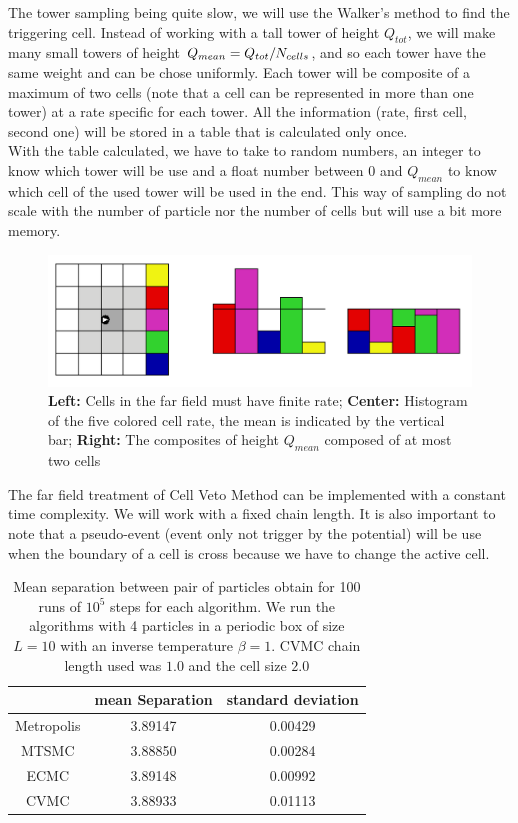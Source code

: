 \documentclass[jcp,twocolumn,longbibliography,superscriptaddress]{revtex4-2}
\begin{document}
	The tower sampling being quite slow, we will use the Walker's method  to find the triggering cell. Instead of working with a tall tower of height $Q_{tot}$, we will make many small towers of height $Q_{mean} = Q_{tot} / N_{cells}$, and so each tower have the same weight and can be chose uniformly. Each tower will be composite of a maximum of two cells (note that a cell can be represented in more than one tower) at a rate specific for each tower. All the information (rate, first cell, second one) will be stored in a table that is calculated only once.\\
	
	With the table calculated, we have to take to random numbers, an integer to know which tower will be use and a float number between 0 and $Q_{mean}$ to know which cell of the used tower will be used in the end. This way of sampling do not scale with the number of particle nor the number of cells but will use a bit more memory.\\
	
	\begin{figure}[htb]
		\centering
		\includegraphics[width=\columnwidth]{./Figures/WalkerMethod.png}
		\caption{\textbf{Left:} Cells in the far field must have finite rate; \textbf{Center:} Histogram of the five colored cell rate, the mean is indicated by the vertical bar; \textbf{Right:} The composites of height $Q_{mean}$ composed of at most two cells}
		\label{Walker's Method}
	\end{figure}

	The far field treatment of Cell Veto Method  can be implemented with a constant time complexity. We will work with a fixed chain length. It is also important to note that a pseudo-event (event only not trigger by the potential) will be use when the boundary of a cell is cross because we have to change the active cell.
	
		\begin{table}[htb]
		\begin{tabular}{|c|c|c|}
			\hline
			& mean Separation & standard deviation\\
			\hline
			Metropolis & 3.89147 & 0.00429\\
			MTSMC & 3.88850 & 0.00284\\
			ECMC & 3.89148 & 0.00992\\
			CVMC & 3.88933 & 0.01113\\
			\hline
		\end{tabular}
		\caption{Mean separation between pair of particles obtain for 100 runs of $10^5$ steps for each algorithm. We run  the algorithms with 4 particles in a periodic box of size $L=10$ with an inverse temperature $\beta = 1$. CVMC chain length used was $1.0$ and the cell size $2.0$}
		\label{Comparison}
	\end{table}
	
\end{document}
